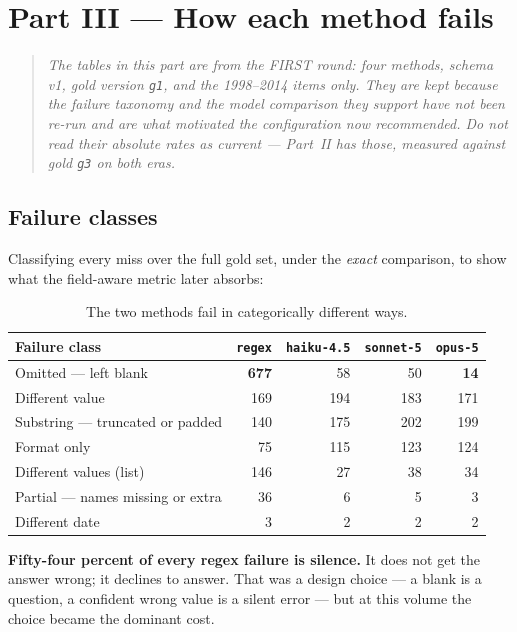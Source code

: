 \documentclass[11pt]{article}
\begin{document}
\section{Part III --- How each method fails}

\begin{quote}\small\itshape
The tables in this part are from the FIRST round: four methods, schema v1, gold version
\texttt{g1}, and the 1998--2014 items only. They are kept because the failure taxonomy and the
model comparison they support have not been re-run and are what motivated the configuration
now recommended. Do not read their absolute rates as current --- Part~II has those, measured
against gold \texttt{g3} on both eras.
\end{quote}

\subsection{Failure classes}

Classifying every miss over the full gold set, under the \emph{exact} comparison, to show
what the field-aware metric later absorbs:

\begin{table}[h]
\centering
\begin{tabular}{lrrrr}
\toprule
Failure class & \texttt{regex} & \texttt{haiku-4.5} & \texttt{sonnet-5} & \texttt{opus-5} \\
\midrule
Omitted --- left blank             & \textbf{677} & 58 & 50 & \textbf{14} \\
Different value                    & 169 & 194 & 183 & 171 \\
Substring --- truncated or padded  & 140 & 175 & 202 & 199 \\
Format only                        &  75 & 115 & 123 & 124 \\
Different values (list)            & 146 &  27 &  38 &  34 \\
Partial --- names missing or extra &  36 &   6 &   5 &   3 \\
Different date                     &   3 &   2 &   2 &   2 \\
\bottomrule
\end{tabular}
\caption{The two methods fail in categorically different ways.}
\end{table}

\textbf{Fifty-four percent of every regex failure is silence.} It does not get the answer
wrong; it declines to answer. That was a design choice --- a blank is a question, a confident
wrong value is a silent error --- but at this volume the choice became the dominant cost.
\end{document}
